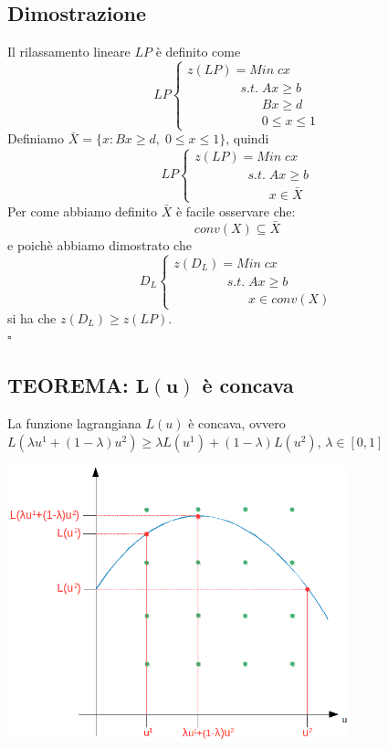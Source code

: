 \subsection{Dimostrazione}
Il rilassamento lineare $LP$ è definito come
\begin{equation}
	LP
	\begin{cases}
		z(LP)=Min\;cx \\
		\;\;\;\;\;\;\;\;\;\;\;\;\;\;\;s.t.\;Ax\ge b \\
		\;\;\;\;\;\;\;\;\;\;\;\;\;\;\;\;\;\;\;\;\;Bx\ge d \\
		\;\;\;\;\;\;\;\;\;\;\;\;\;\;\;\;\;\;\;\;\;0\le x\le 1
	\end{cases}
\end{equation}
Definiamo $\bar{X}=\{x:Bx\ge d,\;0\le x\le 1\}$, quindi
\begin{equation}
	LP
	\begin{cases}
		z(LP)=Min\;cx \\
		\;\;\;\;\;\;\;\;\;\;\;\;\;\;\;s.t.\;Ax\ge b\\
		\;\;\;\;\;\;\;\;\;\;\;\;\;\;\;\;\;\;\;\;\;x\in\bar{X}
	\end{cases}
\end{equation}
Per come abbiamo definito $\bar{X}$ è facile osservare che:
\begin{equation}
	conv(X)\subseteq\bar{X}
\end{equation}
e poichè abbiamo dimostrato che
\begin{equation}
	D_{L}
	\begin{cases}
		z(D_{L})=Min\;cx\\
		\;\;\;\;\;\;\;\;\;\;\;\;\;\;\;s.t.\;Ax\ge b \\
		\;\;\;\;\;\;\;\;\;\;\;\;\;\;\;\;\;\;\;\;\;x\in conv(X)
	\end{cases}
\end{equation}
si ha che $z(D_{L})\ge z(LP)$.\\
$\square$

\subsection{TEOREMA: $\boldsymbol{L(u)}$ è concava}
La funzione lagrangiana $L(u)$ è concava, ovvero $L(\lambda u^{1}+(1-\lambda)u^{2})\ge \lambda L(u^{1})+(1-\lambda)L(u^{2})$, $\lambda \in [0,1]$

\centerline{\includegraphics[height=8cm]{images/graph28.png}}

